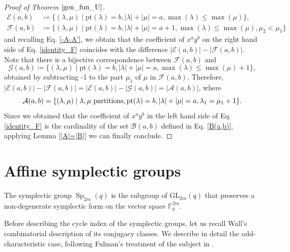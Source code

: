 \documentclass[a4paper, 12pt, oneside]{amsart}
\theoremstyle{definition}
\newcommand{\GL}{\mathrm{GL}}
\newcommand{\pt}{\mathrm{pt}}
\DeclareMathOperator{\Sp}{Sp}
\begin{document}
\begin{proof}[Proof of Theorem $\ref{gen_fun_U}$]
\begin{align*}
\mathcal{E}(a,b)&\coloneqq\{(\lambda,\mu) \mid \pt(\lambda)=b, |\lambda|+|\mu|=a, \max(\lambda) \le \max(\mu)\},\\
\mathcal{F}(a,b)&\coloneqq\{(\lambda,\mu) \mid \pt(\lambda)=b, |\lambda|+|\mu|=a+1, \max(\lambda) \le \max(\mu), \mu_2 <\mu_1\}
\end{align*}
and recalling Eq. \eqref{-A-A'}, we obtain that the coefficient of $x^ay^b$ on the right hand side of Eq. \eqref{identity_F} coincides with the difference $|\mathcal{E}(a,b)|-|\mathcal{F}(a,b)|.$ Note that there is a bijective correspondence between $\mathcal{F}(a,b)$ and
$$\mathcal{G}(a,b)\coloneqq
\{(\lambda,\mu) \mid \pt(\lambda)=b, |\lambda|+|\mu|=a, \max(\lambda) \le \max(\mu)+1\},
$$
obtained by subtracting -1 to the part $\mu_1$ of $\mu$ in $\mathcal{F}(a,b)$.
Therefore, $|\mathcal{E}(a,b)|-|\mathcal{F}(a,b)|=|\mathcal{E}(a,b)|-|\mathcal{G}(a,b)|=|\mathcal{A}(a,b)|$, where 
$$\mathcal{A}(a,b)=\{(\lambda,\mu) \mid \lambda,\mu \textup{ partitions}, \pt(\lambda)=b, |\lambda|+|\mu|=a, \lambda_1=\mu_1+1\}.$$
Since we obtained that the coefficient of $x^ay^b$ in the left hand side of Eq. \eqref{identity_F} is the cardinality of the set $\mathcal{B}(a,b)$ defined in Eq. \eqref{B(a,b)}, applying Lemma \ref{|A|=|B|} we can finally conclude.
\end{proof}

\section{Affine symplectic groups}
\label{sec_symplectic}
The symplectic group $\Sp_{2m}(q)$ is the subgroup of $\GL_{2m}(q)$ that preserves a non-degenerate symplectic form on the vector space $\mathbb{F}_q^{2m}$. 


Before describing the cycle index of the symplectic groups, let us recall Wall's combinatorial description of its conjugacy classes. We describe in detail the odd-characteristic case, following Fulman's treatment of the subject in \cite[Sec. 4.2]{Fulman_cycle_index}. 
\end{document}
